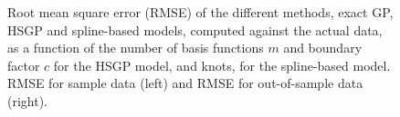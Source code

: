 \documentclass[onecolumn,a4paper,11pt]{article}
\begin{document}
\begin{figure}
\caption{Root mean square error (RMSE) of the different methods, exact GP, HSGP and spline-based models, computed against the actual data, as a function of the number of basis functions $m$ and boundary factor $c$ for the HSGP model, and knots, for the spline-based model. RMSE for sample data (left) and RMSE for out-of-sample data (right).}
  \label{ch5_fig14_MSE_train_gaydata}
\end{figure}
\end{document}
